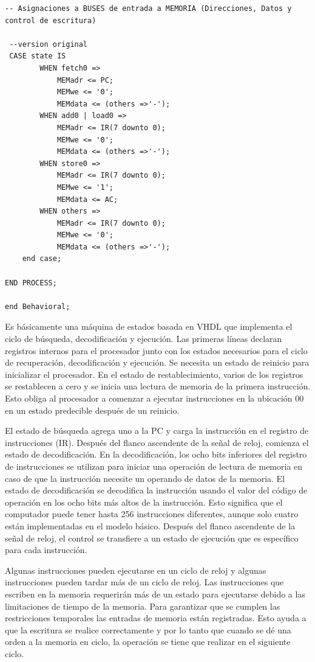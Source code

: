 \begin{lstlisting}
-- Asignaciones a BUSES de entrada a MEMORIA (Direcciones, Datos y control de escritura)
 
 --version original
 CASE state IS
		WHEN fetch0 =>
			MEMadr <= PC;
			MEMwe <= '0';
			MEMdata <= (others =>'-');
		WHEN add0 | load0 =>
			MEMadr <= IR(7 downto 0);
			MEMwe <= '0';
			MEMdata <= (others =>'-');
		WHEN store0 => 
			MEMadr <= IR(7 downto 0);
			MEMwe <= '1';
			MEMdata <= AC;
		WHEN others =>
			MEMadr <= IR(7 downto 0);
			MEMwe <= '0';
			MEMdata <= (others =>'-');
	end case;
	
END PROCESS;

end Behavioral;
\end{lstlisting}

Es básicamente una máquina 
de estados basada en VHDL que implementa el ciclo de búsqueda, decodificación y ejecución. Las primeras líneas declaran registros internos para el 
procesador junto con los estados necesarios para el ciclo de recuperación, decodificación y ejecución. Se necesita un estado de reinicio para 
inicializar el procesador. En el estado de restablecimiento, varios de los registros se restablecen a cero y se inicia una lectura de memoria 
de la primera instrucción. Esto obliga al procesador a comenzar a ejecutar instrucciones en la ubicación 00 en un estado predecible después de un reinicio.

El estado de búsqueda agrega uno a la PC y carga la instrucción en el registro de instrucciones (IR). Después del flanco ascendente de la señal de reloj, 
comienza el estado de decodificación. En la decodificación, los ocho bits inferiores del registro de instrucciones se utilizan para iniciar una operación 
de lectura de memoria en caso de que la instrucción necesite un operando de datos de la memoria. El estado de decodificación se decodifica la instrucción 
usando el valor del código de operación en los ocho bits más altos de la instrucción. Esto significa que el computador puede tener hasta 256 instrucciones 
diferentes, aunque solo cuatro están implementadas en el modelo básico. Después del flanco ascendente de la señal de reloj, el control se transfiere a un 
estado de ejecución que es específico para cada instrucción.

Algunas instrucciones pueden ejecutarse en un ciclo de reloj y algunas instrucciones pueden tardar más de un ciclo de reloj. Las instrucciones que 
escriben en la memoria requerirán más de un estado para ejecutarse debido a las limitaciones de tiempo de la memoria. Para garantizar que se cumplen 
las restricciones temporales las entradas de memoria están registradas. Esto ayuda a que la escritura se realice correctamente y por lo tanto que 
cuando se dé una orden a la memoria en ciclo, la operación se tiene que realizar en el siguiente ciclo.

